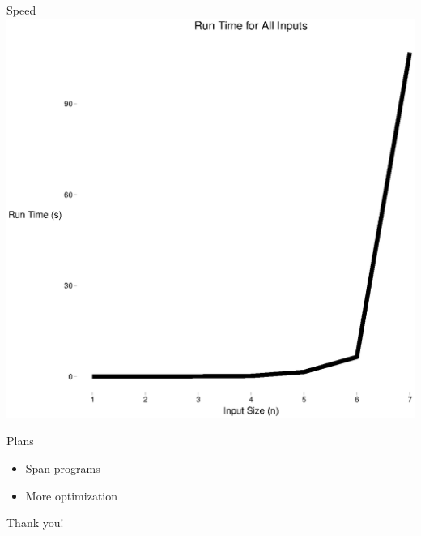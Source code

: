 \documentclass[12pt]{beamer}
\begin{document}
\begin{frame}{Speed}
\centering
\includegraphics[scale=.5]{figure_all_or_time.eps}
\end{frame}

\begin{frame}{Plans}
\begin{itemize}
    \item Span programs
    \item More optimization
\end{itemize} 
\end{frame}

\begin{frame}{Thank you!}


\end{frame}
\end{document}
